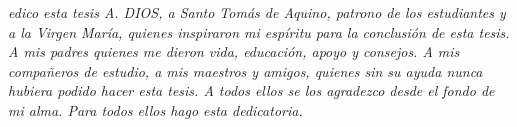 \begin{Dedicatoria}
\begin{center}
{\fontsize{25}{0}\selectfont{D}}
\textit{edico esta tesis  A. DIOS, a Santo Tomás de Aquino, patrono de los estudiantes y a la Virgen María, quienes inspiraron mi espíritu para la conclusión de esta tesis. A mis  padres quienes me dieron vida, educación,  apoyo y consejos. A mis compañeros de estudio, a mis maestros y amigos, quienes sin su ayuda nunca hubiera podido hacer esta tesis. A todos ellos se los agradezco desde el fondo de mi alma. Para todos ellos hago esta dedicatoria.}
\end{center}
\end{Dedicatoria}

% 
%
%
%
% 
%
%
